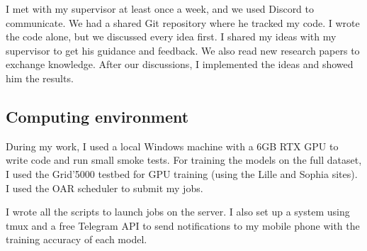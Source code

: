 

I met with my supervisor at least once a week, and we used Discord to communicate. We had a shared Git repository where he tracked my code. I wrote the code alone, but we discussed every idea first. I shared my ideas with my supervisor to get his guidance and feedback. We also read new research papers to exchange knowledge. After our discussions, I implemented the ideas and showed him the results.

\subsection{Computing environment}



During my work, I used a local Windows machine with a 6GB RTX GPU to write code and run small smoke tests. For training the models on the full dataset, I used the Grid'5000 testbed \citep{balouek2013grid5000} for GPU training (using the Lille and Sophia sites). I used the OAR scheduler to submit my jobs.

\begin{contribution}
I wrote all the scripts to launch jobs on the server. I also set up a system using tmux and a free Telegram API to send notifications to my mobile phone with the training accuracy of each model.
\end{contribution}